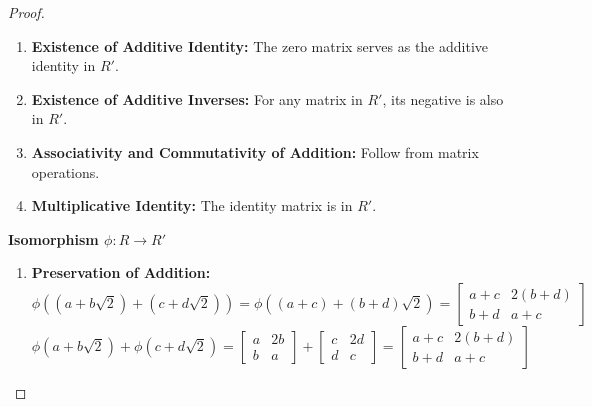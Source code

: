 \documentclass[12pt]{amsart}
\theoremstyle{definition}
\numberwithin{equation}{section}
\theoremstyle{plain}
\begin{document}
\begin{exercise}{17}
\begin{proof}
\begin{enumerate}
        \item \textbf{Existence of Additive Identity:} The zero matrix serves as the additive identity in \( R' \).
        
        \item \textbf{Existence of Additive Inverses:} For any matrix in \( R' \), its negative is also in \( R' \).
        
        \item \textbf{Associativity and Commutativity of Addition:} Follow from matrix operations.
        
        \item \textbf{Multiplicative Identity:} The identity matrix is in \( R' \).
    \end{enumerate}
    
    \textbf{Isomorphism \( \phi : R \rightarrow R' \)}
    
    \begin{enumerate}
        \item \textbf{Preservation of Addition:}
           \[
           \phi((a + b\sqrt{2}) + (c + d\sqrt{2})) = \phi((a+c) + (b+d)\sqrt{2}) = 
           \begin{bmatrix}
            a+c & 2(b+d) \\
            b+d & a+c
           \end{bmatrix}
           \]
           \[
           \phi(a + b\sqrt{2}) + \phi(c + d\sqrt{2}) =
           \begin{bmatrix}
            a & 2b \\
            b & a
           \end{bmatrix} +
           \begin{bmatrix}
            c & 2d \\
            d & c
           \end{bmatrix} =
           \begin{bmatrix}
            a+c & 2(b+d) \\
            b+d & a+c
           \end{bmatrix}
           \]
        

\end{enumerate}
\end{proof}
\end{exercise}
\end{document}
